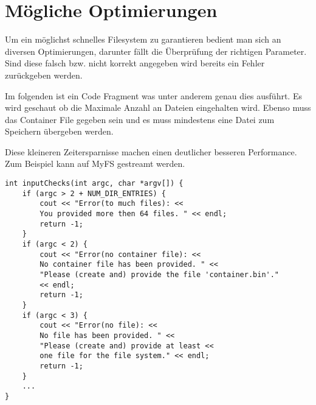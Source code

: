 \newpage

\section{Mögliche Optimierungen}
Um ein möglichst schnelles Filesystem zu garantieren bedient man sich an diversen Optimierungen, darunter fällt die Überprüfung der richtigen Parameter. Sind diese falsch bzw. nicht korrekt angegeben wird bereits ein Fehler zurückgeben werden. 

Im folgenden ist ein Code Fragment was unter anderem genau dies ausführt. Es wird geschaut ob die Maximale Anzahl an Dateien eingehalten wird. Ebenso muss das Container File gegeben sein und es muss mindestens eine Datei zum Speichern übergeben werden. 

Diese kleineren Zeitersparnisse machen einen deutlicher besseren Performance. Zum Beispiel kann auf MyFS gestreamt werden.

\begin{lstlisting}
int inputChecks(int argc, char *argv[]) {
	if (argc > 2 + NUM_DIR_ENTRIES) {
		cout << "Error(to much files): <<
		You provided more then 64 files. " << endl;
		return -1;
	}
	if (argc < 2) {
		cout << "Error(no container file): <<
		No container file has been provided. " << 
		"Please (create and) provide the file 'container.bin'." 
		<< endl;
		return -1;
	}
	if (argc < 3) {
		cout << "Error(no file): << 
		No file has been provided. " << 
		"Please (create and) provide at least << 
		one file for the file system." << endl;
		return -1;
	}
	...
}
\end{lstlisting}

